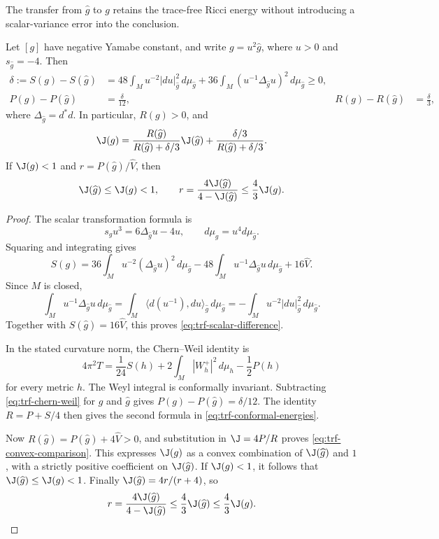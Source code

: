The transfer from $\widehat g$ to $g$ retains the trace-free Ricci energy
without introducing a scalar-variance error into the conclusion.

\begin{lemma}
\label{lem:trf-conformal}
Let $[g]$ have negative Yamabe constant, and write
$g=u^2\widehat g$, where $u>0$ and $s_{\widehat g}=-4$.  Then
\begin{align}
 \delta:=S(g)-S(\widehat g)
 &=48\int_Mu^{-2}|du|_{\widehat g}^2\,d\mu_{\widehat g}
   +36\int_M(u^{-1}\Delta_{\widehat g}u)^2\,d\mu_{\widehat g}
   \ge0,\label{eq:trf-scalar-difference}\\
 P(g)-P(\widehat g)&=\frac{\delta}{12},&
 R(g)-R(\widehat g)&=\frac{\delta}{3},
 \label{eq:trf-conformal-energies}
\end{align}
where $\Delta_{\widehat g}=d^*d$.  In particular, $R(g)>0$, and
\begin{equation}
 \J(g)=
 \frac{R(\widehat g)}{R(\widehat g)+\delta/3}\J(\widehat g)
 +\frac{\delta/3}{R(\widehat g)+\delta/3}.
 \label{eq:trf-convex-comparison}
\end{equation}
If $\J(g)<1$ and $r=P(\widehat g)/\widehat V$, then
\begin{equation}
 \J(\widehat g)\le\J(g)<1,
 \qquad
 r=\frac{4\J(\widehat g)}{4-\J(\widehat g)}
 \le\frac43\J(g).
 \label{eq:trf-small-J}
\end{equation}
\end{lemma}

\begin{proof}
The scalar transformation formula is
\[
 s_g u^3=6\Delta_{\widehat g}u-4u,
 \qquad d\mu_g=u^4d\mu_{\widehat g}.
\]
Squaring and integrating gives
\[
 S(g)=36\int_Mu^{-2}(\Delta_{\widehat g}u)^2\,d\mu_{\widehat g}
       -48\int_Mu^{-1}\Delta_{\widehat g}u\,d\mu_{\widehat g}
       +16\widehat V.
\]
Since $M$ is closed,
\[
 \int_Mu^{-1}\Delta_{\widehat g}u\,d\mu_{\widehat g}
 =\int_M\langle d(u^{-1}),du\rangle_{\widehat g}\,d\mu_{\widehat g}
 =-\int_Mu^{-2}|du|_{\widehat g}^2\,d\mu_{\widehat g}.
\]
Together with $S(\widehat g)=16\widehat V$, this proves
\eqref{eq:trf-scalar-difference}.

In the stated curvature norm, the Chern--Weil identity is
\begin{equation}
 4\pi^2T=\frac1{24}S(h)
       +2\int_M|W_h^+|^2\,d\mu_h-\frac12P(h)
 \label{eq:trf-chern-weil}
\end{equation}
for every metric $h$.  The Weyl integral is conformally invariant.
Subtracting \eqref{eq:trf-chern-weil} for $g$ and $\widehat g$ gives
$P(g)-P(\widehat g)=\delta/12$.  The identity
$R=P+S/4$ then gives the second formula in
\eqref{eq:trf-conformal-energies}.

Now $R(\widehat g)=P(\widehat g)+4\widehat V>0$, and substitution
in $\J=4P/R$ proves \eqref{eq:trf-convex-comparison}.  This expresses
$\J(g)$ as a convex combination of $\J(\widehat g)$ and $1$, with
a strictly positive coefficient on $\J(\widehat g)$.  If $\J(g)<1$,
it follows that $\J(\widehat g)\le\J(g)<1$.  Finally
$\J(\widehat g)=4r/(r+4)$, so
\[
 r=\frac{4\J(\widehat g)}{4-\J(\widehat g)}
 \le\frac43\J(\widehat g)\le\frac43\J(g).
\]
\end{proof}

